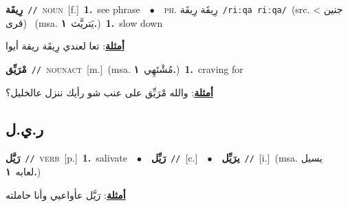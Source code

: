 \documentclass[10pt,a4paper,twoside]{article} %
\begin{document}
\begin{multicols}{2}
{\setlength\topsep{0pt}\textbf{\foreignlanguage{arabic}{رِيقَة}}\ {\color{gray}\texttt{//}\color{black}}\ \textsc{noun}\ [f.]\ \textbf{1.}~see phrase\ \ $\bullet$\ \ \textsc{ph.} \color{gray} \foreignlanguage{arabic}{رِيقَة رِيقَة}\color{black}\ {\color{gray}\texttt{/{\sffamily riːqa riːqa}/}\color{black}}\ \color{gray}(src. \foreignlanguage{arabic}{جنين > قرى})\color{black}\ \color{gray} (msa. \foreignlanguage{arabic}{يَتريَّث}~\foreignlanguage{arabic}{\textbf{١.}})\color{black}\ \textbf{1.}~slow down\  \begin{flushright}\color{gray}\foreignlanguage{arabic}{\textbf{\underline{\foreignlanguage{arabic}{أمثلة}}}: تعا لعندي رِيقَة ريقة أيوا}\end{flushright}\color{black}} \vspace{2mm}

{\setlength\topsep{0pt}\textbf{\foreignlanguage{arabic}{مْرَيِّق}}\ {\color{gray}\texttt{//}\color{black}}\ \textsc{noun\textunderscore act}\ [m.]\ \color{gray}(msa. \foreignlanguage{arabic}{مُشْتَهِي}~\foreignlanguage{arabic}{\textbf{١.}})\color{black}\ \textbf{1.}~craving for\  \begin{flushright}\color{gray}\foreignlanguage{arabic}{\textbf{\underline{\foreignlanguage{arabic}{أمثلة}}}: والله مْرَيِّق على عنب شو رأيك ننزل عالخليل؟}\end{flushright}\color{black}} \vspace{2mm}

\vspace{-3mm}
\subsection*{\color{blue}\foreignlanguage{arabic}{ر.ي.ل}\color{blue}{}} 

{\setlength\topsep{0pt}\textbf{\foreignlanguage{arabic}{رَيَّل}}\ {\color{gray}\texttt{//}\color{black}}\ \textsc{verb}\ [p.]\ \textbf{1.}~salivate\ \ $\bullet$\ \ \setlength\topsep{0pt}\textbf{\foreignlanguage{arabic}{رَيِّل}}\ {\color{gray}\texttt{//}\color{black}}\ [c.]\ \ $\bullet$\ \ \setlength\topsep{0pt}\textbf{\foreignlanguage{arabic}{يرَيِّل}}\ {\color{gray}\texttt{//}\color{black}}\ [i.]\ \color{gray}(msa. \foreignlanguage{arabic}{يسيل لعابه}~\foreignlanguage{arabic}{\textbf{١.}})\color{black}\  \begin{flushright}\color{gray}\foreignlanguage{arabic}{\textbf{\underline{\foreignlanguage{arabic}{أمثلة}}}: رَيَّل عأواعيي وأنا حاملته}\end{flushright}\color{black}} \vspace{2mm}


\end{multicols}
\end{document}
